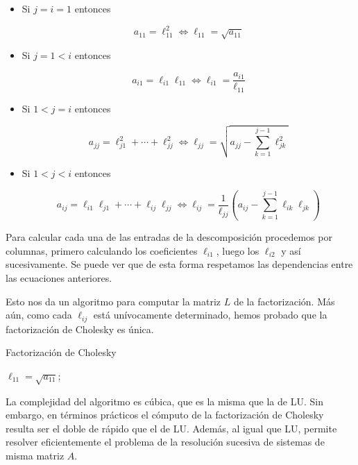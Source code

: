 \begin{itemize}
\item Si $j = i = 1$ entonces

\[a_{11} = \ell_{11}^2 \Leftrightarrow \ell_{11} = \sqrt{a_{11}}\]

\item Si $j = 1 < i$ entonces

\[a_{i1} = \ell_{i1}\ell_{11} \Leftrightarrow \ell_{i1} = \frac{a_{i1}}{\ell_{11}}\]

\item Si $1 < j = i$ entonces

\[a_{jj} = \ell_{j1}^2 + \cdots + \ell_{jj}^2 \Leftrightarrow \ell_{jj} = \sqrt{a_{jj} - \sum_{k = 1}^{j - 1}\ell_{jk}^2}\]

\item Si $1 < j < i$ entonces

\[a_{ij} = \ell_{i1}\ell_{j1} + \cdots + \ell_{ij}\ell_{jj} \Leftrightarrow \ell_{ij} = \frac{1}{\ell_{jj}}\left(a_{ij} - \sum_{k = 1}^{j - 1}\ell_{ik}\ell_{jk}\right)\]

\end{itemize}

Para calcular cada una de las entradas de la descomposición procedemos por columnas, primero calculando los coeficientes $\ell_{i1}$, luego los $\ell_{i2}$ y así sucesivamente. Se puede ver que de esta forma respetamos las dependencias entre las ecuaciones anteriores.

Esto nos da un algoritmo para computar la matriz $L$ de la factorización. Más aún, como cada $\ell_{ij}$ está unívocamente determinado, hemos probado que la factorización de Cholesky es única.

\begin{algorithm}
\caption[]{Factorización de Cholesky}
$\ell_{11} = \sqrt{a_{11}}$;\\
\end{algorithm}

La complejidad del algoritmo es cúbica, que es la misma que la de LU. Sin embargo, en términos prácticos el cómputo de la factorización de Cholesky resulta ser el doble de rápido que el de LU. Además, al igual que LU, permite resolver eficientemente el problema de la resolución sucesiva de sistemas de misma matriz $A$.

